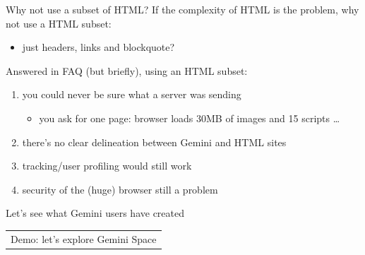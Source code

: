 \documentclass[presentation, 11pt,  aspectratio=169]{beamer}
\begin{document}
\begin{frame}[label={sec:org9524579}]{Why not use a subset of HTML?}
If the complexity of HTML is the problem, why not use a HTML subset:\\
\begin{itemize}
\item just headers, links and blockquote?\\
\end{itemize}

\pause
\begin{block}{Answered in FAQ (but briefly), using an HTML subset:}
\begin{enumerate}
\item you could never be sure what a server was sending\\
\begin{itemize}
\item you ask for one page: browser loads 30MB of images and 15 scripts \ldots{}\\
\end{itemize}
\item there's no clear delineation between Gemini and HTML sites\\
\item tracking/user profiling would still work\\
\item security of the (huge) browser still a problem\\
\end{enumerate}
\end{block}
\end{frame}

\begin{frame}[label={sec:org801b271}]{Let's see what Gemini users have created}
\begin{center}
\begin{tabular}{c}
Demo: let's explore Gemini Space\\
\end{tabular}
\end{center}
\end{frame}
\end{document}
